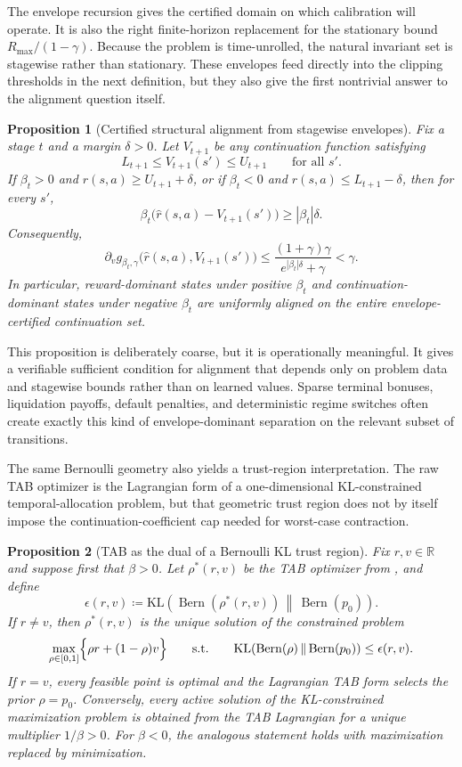 \documentclass{article}
\newtheorem{proposition}[proposition]{Proposition}
\theoremstyle{remark}
\DeclareMathOperator{\Bern}{Bern}
\newcommand{\R}{\mathbb{R}}
\newcommand{\KL}{\mathrm{KL}}
\newcommand{\defeq}{\coloneqq}
\newcommand{\pprior}{p_0}
\newcommand{\KLbin}[2]{\KL\!\left(\Bern(#1)\,\middle\|\,\Bern(#2)\right)}
\begin{document}
The envelope recursion gives the certified domain on which calibration will operate. It is also the right finite-horizon replacement for the stationary bound $R_{\max}/(1-\gamma)$. Because the problem is time-unrolled, the natural invariant set is stagewise rather than stationary. These envelopes feed directly into the clipping thresholds in the next definition, but they also give the first nontrivial answer to the alignment question itself.

\begin{proposition}[Certified structural alignment from stagewise envelopes]
\label{prop:structural-alignment}
Fix a stage $t$ and a margin $\delta>0$. Let $V_{t+1}$ be any continuation function satisfying
\[
L_{t+1}\le V_{t+1}(s')\le U_{t+1}
\qquad \text{for all } s'.
\]
If $\beta_t>0$ and $\hat r(s,a)\ge U_{t+1}+\delta$, or if $\beta_t<0$ and $\hat r(s,a)\le L_{t+1}-\delta$, then for every $s'$,
\[
\beta_t\bigl(\hat r(s,a)-V_{t+1}(s')\bigr)\ge |\beta_t|\delta.
\]
Consequently,
\[
\partial_v g_{\beta_t,\gamma}\bigl(\hat r(s,a),V_{t+1}(s')\bigr)
\le
\frac{(1+\gamma)\gamma}{e^{|\beta_t|\delta}+\gamma}
<\gamma.
\]
In particular, reward-dominant states under positive $\beta_t$ and continuation-dominant states under negative $\beta_t$ are uniformly aligned on the entire envelope-certified continuation set.
\end{proposition}

This proposition is deliberately coarse, but it is operationally meaningful. It gives a verifiable sufficient condition for alignment that depends only on problem data and stagewise bounds rather than on learned values. Sparse terminal bonuses, liquidation payoffs, default penalties, and deterministic regime switches often create exactly this kind of envelope-dominant separation on the relevant subset of transitions.

The same Bernoulli geometry also yields a trust-region interpretation. The raw TAB optimizer is the Lagrangian form of a one-dimensional KL-constrained temporal-allocation problem, but that geometric trust region does not by itself impose the continuation-coefficient cap needed for worst-case contraction.

\begin{proposition}[TAB as the dual of a Bernoulli KL trust region]
\label{prop:trust-region-dual}
Fix $r,v\in\R$ and suppose first that $\beta>0$. Let $\rho^*(r,v)$ be the TAB optimizer from , and define
\[
\epsilon(r,v) \defeq \KLbin{\rho^*(r,v)}{\pprior}.
\]
If $r\neq v$, then $\rho^*(r,v)$ is the unique solution of the constrained problem
\[
\max_{\rho\in[0,1]}
\Bigl\{\rho r + (1-\rho)v\Bigr\}
\qquad
\text{s.t.}
\qquad
\KLbin{\rho}{\pprior}\le \epsilon(r,v).
\]
If $r=v$, every feasible point is optimal and the Lagrangian TAB form selects the prior $\rho=\pprior$. Conversely, every active solution of the KL-constrained maximization problem is obtained from the TAB Lagrangian for a unique multiplier $1/\beta>0$. For $\beta<0$, the analogous statement holds with maximization replaced by minimization.
\end{proposition}
\end{document}
